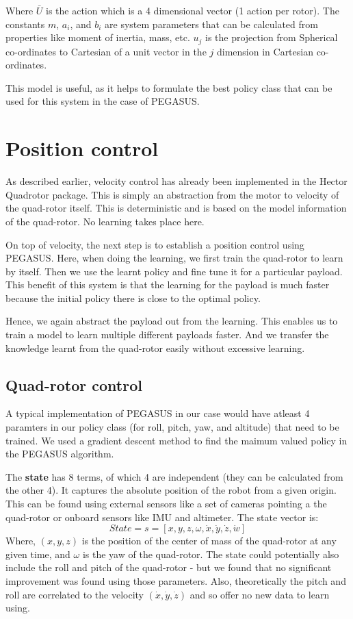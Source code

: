 \documentclass[BTech]{iitmdiss}
\begin{document}
Where $\bar{U}$ is the action which is a 4 dimensional vector (1 action per rotor). The constants $m$, $a_{i}$, and $b_{i}$ are system parameters that can be calculated from properties like moment of inertia, mass, etc. $u_{j}$ is the projection from Spherical co-ordinates to Cartesian of a unit vector in the $j$ dimension in Cartesian co-ordinates.

This model is useful, as it helps to formulate the best policy class that can be used for this system in the case of PEGASUS.

\chapter{Position control}

As described earlier, velocity control has already been implemented in the Hector Quadrotor package. This is simply an abstraction from the motor to velocity of the quad-rotor itself. This is deterministic and is based on the model information of the quad-rotor. No learning takes place here.

On top of velocity, the next step is to establish a position control using PEGASUS. Here, when doing the learning, we first train the quad-rotor to learn by itself. Then we use the learnt policy and fine tune it for a particular payload. This benefit of this system is that the learning for the payload is much faster because the initial policy there is close to the optimal policy.

Hence, we again abstract the payload out from the learning. This enables us to train a model to learn multiple different payloads faster. And we transfer the knowledge learnt from the quad-rotor easily without excessive learning.

\section{Quad-rotor control}

A typical implementation of PEGASUS in our case would have atleast 4 paramters in our policy class (for roll, pitch, yaw, and altitude) that need to be trained. We used a gradient descent method to find the maimum valued policy in the PEGASUS algorithm.

The {\bf state} has 8 terms, of which 4 are independent (they can be calculated from the other 4). It captures the absolute position of the robot from a given origin. This can be found using external sensors like a set of cameras pointing a the quad-rotor or onboard sensors like IMU and altimeter. The state vector is:
\begin{equation}
  State = s = [x, y, z, \omega, \dot{x}, \dot{y}, \dot{z}, \dot{w}]
\end{equation}
Where, $(x, y, z)$ is the position of the center of mass of the quad-rotor at any given time, and $\omega$ is the yaw of the quad-rotor. The state could potentially also include the roll and pitch of the quad-rotor - but we found that no significant improvement was found using those parameters. Also, theoretically the pitch and roll are correlated to the velocity $(\dot{x}, \dot{y}, \dot{z})$ and so offer no new data to learn using.
\end{document}
